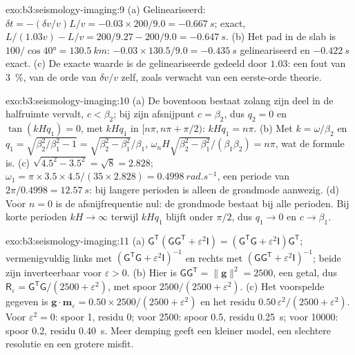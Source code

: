 \begin{solution}{exo:b3:seismology-imaging:9}
(a) Gelineariseerd: $\delta t = -(\delta v/v)L/v = -0.03\times200/9.0 =
\qty{-0.667}{s}$; exact, $L/(1.03v) - L/v = 200/9.27 - 200/9.0 =
\qty{-0.647}{s}$. (b) Het pad in de slab is $100/\cos\ang{40} =
\qty{130.5}{km}$: $-0.03\times130.5/9.0 = \qty{-0.435}{s}$ gelineariseerd en
$\qty{-0.422}{s}$ exact. (c) De exacte waarde is de gelineariseerde gedeeld door
$1.03$: een fout van \qty{3}{\percent}, van de orde van $\delta v/v$ zelf, zoals
verwacht van een eerste-orde theorie.
\end{solution}

\begin{solution}{exo:b3:seismology-imaging:10}
(a) De boventoon bestaat zolang zijn deel in de halfruimte vervalt, $c < \beta_2$; bij zijn
afsnijpunt $c = \beta_2$, dus $q_2 = 0$ en $\tan(kHq_1) = 0$, met $kHq_1$ in
$[n\pi, n\pi + \pi/2)$: $kHq_1 = n\pi$. (b) Met $k = \omega/\beta_2$ en
$q_1 = \sqrt{\beta_2^2/\beta_1^2 - 1} = \sqrt{\beta_2^2 - \beta_1^2}/\beta_1$,
$\omega_nH\sqrt{\beta_2^2 - \beta_1^2}/(\beta_1\beta_2) = n\pi$, wat de
formule is. (c) $\sqrt{4.5^2 - 3.5^2} = \sqrt8 = 2.828$; $\omega_1 =
\pi\times3.5\times4.5/(35\times2.828) = \qty{0.4998}{rad.s^{-1}}$, een periode van
$2\pi/0.4998 = \qty{12.57}{s}$: bij langere perioden is alleen de grondmode
aanwezig. (d) Voor $n = 0$ is de afsnijfrequentie nul: de grondmode
bestaat bij alle perioden. Bij korte perioden $kH \to \infty$ terwijl $kHq_1$ blijft
onder $\pi/2$, dus $q_1 \to 0$ en $c \to \beta_1$.
\end{solution}

\begin{solution}{exo:b3:seismology-imaging:11}
(a) $\mathsf G^{\mathsf T}(\mathsf G\mathsf G^{\mathsf T} + \varepsilon^2\mathsf I)
= (\mathsf G^{\mathsf T}\mathsf G + \varepsilon^2\mathsf I)\mathsf G^{\mathsf T}$;
vermenigvuldig links met $(\mathsf G^{\mathsf T}\mathsf G + \varepsilon^2
\mathsf I)^{-1}$ en rechts met $(\mathsf G\mathsf G^{\mathsf T} +
\varepsilon^2\mathsf I)^{-1}$; beide zijn inverteerbaar voor $\varepsilon > 0$.
(b) Hier is $\mathsf G\mathsf G^{\mathsf T} = \|\mathbf g\|^2 = 2500$, een getal,
dus $\mathsf R_\varepsilon = \mathsf G^{\mathsf T}\mathsf G/(2500 + \varepsilon^2)$,
met spoor $2500/(2500 + \varepsilon^2)$. (c) Het voorspelde gegeven is
$\mathbf g\cdot\mathbf m_\varepsilon = 0.50\times2500/(2500 + \varepsilon^2)$
en het residu $0.50\,\varepsilon^2/(2500 + \varepsilon^2)$. Voor
$\varepsilon^2 = 0$: spoor 1, residu 0; voor 2500: spoor 0.5, residu
\qty{0.25}{s}; voor \num{10000}: spoor 0.2, residu \qty{0.40}{s}. Meer demping
geeft een kleiner model, een slechtere resolutie en een grotere misfit.
\end{solution}

